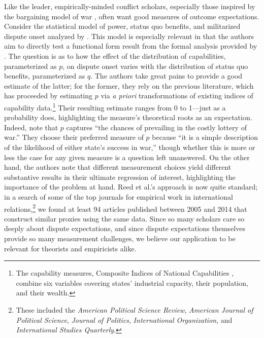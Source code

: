 Like the leader, empirically-minded conflict scholars, especially those inspired by the bargaining model of war \citep{fearon1995}, often want good measures of outcome expectations.  
Consider the statistical model of power, status quo benefits, and militarized dispute onset analyzed by \citet{reed2008war}.
This model is especially relevant in that the authors aim to directly test a functional form result from the formal analysis provided by \citet{powell1996stability,powell1999}.
The question is as to how the effect of the distribution of capabilities, parameterized as $p$, on dispute onset varies with the distribution of status quo benefits, parameterized as $q$.
The authors take great pains to provide a good estimate of the latter; for the former, they rely on the previous literature, which has proceeded by estimating $p$ via \emph{a priori} transformations of existing indices of capability data.\footnote{The capability measures, Composite Indices of National Capabilities \citep{singer1972}, combine six variables covering states' industrial capacity, their population, and their wealth.}
Their resulting estimate ranges from 0 to 1---just as a probability does, highlighting the measure's theoretical roots as an expectation.
Indeed, \citet[Footnote 11, p. 1211]{reed2008war} note that $p$ captures ``the chances of prevailing in the costly lottery of war.''
They choose their preferred measure of $p$ because ``it is a simple description of the likelihood of either state's success in war,'' though whether this is more or less the case for any given measure is a question left unanswered.
On the other hand, the authors note that different measurement choices yield different substantive results in their ultimate regression of interest, highlighting the importance of the problem at hand.
Reed et al.'s approach is now quite standard; in a search of some of the top journals for empirical work in international relations,\footnote{These included the \emph{American Political Science Review}, \emph{American Journal of Political Science}, \emph{Journal of Politics}, \emph{International Organization}, and \emph{International Studies Quarterly}.} we found at least 94 articles published between 2005 and 2014 that construct similar proxies using the same data.
Since so many scholars care so deeply about dispute expectations, and since dispute expectations themselves provide so many measurement challenges, we believe our application to be relevant for theorists and empiricists alike.

